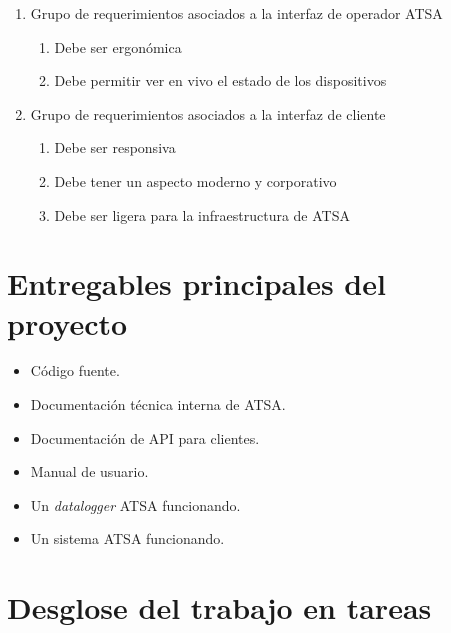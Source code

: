 \documentclass[
12pt,
spanish,
singlespacing,
parskip,
headsepline,]{article}
\begin{document}
\begin{enumerate}
	\item Grupo de requerimientos asociados a la interfaz de operador ATSA
		\begin{enumerate}
			\item Debe ser ergonómica
			\item Debe permitir ver en vivo el estado de los dispositivos
		\end{enumerate}
	\item Grupo de requerimientos asociados a la interfaz de cliente
		\begin{enumerate}
			\item Debe ser responsiva
			\item Debe tener un aspecto moderno y corporativo
			\item Debe ser ligera para la infraestructura de ATSA
		\end{enumerate}
\end{enumerate}

\section{Entregables principales del proyecto}

\begin{itemize}
	\item Código fuente.
	\item Documentación técnica interna de ATSA.
	\item Documentación de API para clientes.
	\item Manual de usuario.
	\item Un \emph{datalogger} ATSA funcionando.
	\item Un sistema ATSA funcionando.
\end{itemize}

\section{Desglose del trabajo en tareas}
\end{document}
